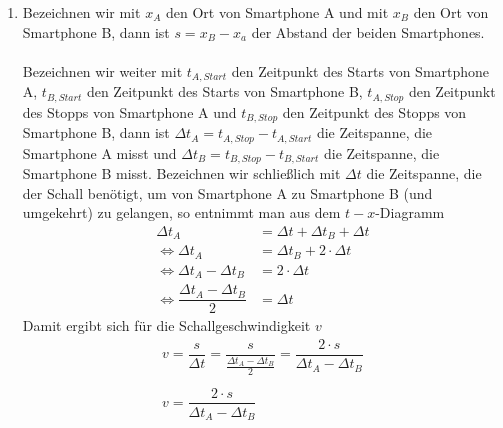 \documentclass[12pt,oneside]{scrartcl}
\begin{document}
\begin{enumerate}
\item Bezeichnen wir mit $x_A$ den Ort von Smartphone A und mit $x_B$ den Ort von Smartphone B, dann ist $s = x_B - x_a$ der Abstand der beiden Smartphones.\\\\
Bezeichnen wir weiter mit $t_{A,Start}$ den Zeitpunkt des Starts von Smartphone A, $t_{B,Start}$ den Zeitpunkt des Starts von Smartphone B, $t_{A,Stop}$ den Zeitpunkt des Stopps von Smartphone A und $t_{B,Stop}$ den Zeitpunkt des Stopps von Smartphone B, dann ist $\Delta t_A = t_{A,Stop} - t_{A,Start}$ die Zeitspanne, die Smartphone A misst und $\Delta t_B = t_{B,Stop} - t_{B,Start}$ die Zeitspanne, die Smartphone B misst.
Bezeichnen wir schließlich mit $\Delta t$ die Zeitspanne, die der Schall benötigt, um von Smartphone A zu Smartphone B (und umgekehrt) zu gelangen, so entnimmt man aus dem $t-x$-Diagramm
\begin{align*}
\Delta t_A&=\Delta t+\Delta t_B +\Delta t\\
\Leftrightarrow \Delta t_A&=\Delta t_B + 2\cdot\Delta t\\
\Leftrightarrow \Delta t_A-\Delta t_B&=2\cdot\Delta t\\
\Leftrightarrow \dfrac{\Delta t_A-\Delta t_B}{2}&=\Delta t
\end{align*}
Damit ergibt sich für die Schallgeschwindigkeit $v$
\begin{align*}
v=\dfrac{s}{\Delta t}=\dfrac{s}{\frac{\Delta t_A-\Delta t_B}{2}}=\dfrac{2\cdot s}{\Delta t_A-\Delta t_B}\\
\\
\boxed{v=\dfrac{2\cdot s}{\Delta t_A-\Delta t_B}}
\end{align*}
\end{enumerate}
\end{document}
